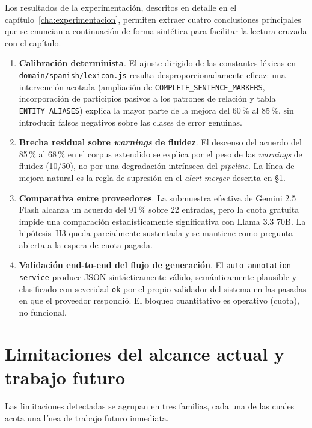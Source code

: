 Los resultados de la experimentación, descritos en detalle en el
capítulo~\ref{cha:experimentacion}, permiten extraer cuatro conclusiones
principales que se enuncian a continuación de forma sintética para facilitar la
lectura cruzada con el capítulo.

\begin{enumerate}
	\item \textbf{Calibración determinista}. El ajuste dirigido de las constantes léxicas
	      en \texttt{domain/spanish/lexicon.js} resulta desproporcionadamente eficaz: una
	      intervención acotada (ampliación de \texttt{COMPLETE\_SENTENCE\_MARKERS},
	      incorporación de participios pasivos a los patrones de relación y tabla
	      \texttt{ENTITY\_ALIASES}) explica la mayor parte de la mejora del 60\,\% al
	      85\,\%, sin introducir falsos negativos sobre las clases de error genuinas.
	\item \textbf{Brecha residual sobre \textit{warnings} de fluidez}. El descenso del
	      acuerdo del 85\,\% al 68\,\% en el corpus extendido se explica por el peso de
	      las \textit{warnings} de fluidez (10/50), no por una degradación intrínseca del
	      \textit{pipeline}. La línea de mejora natural es la regla de supresión en el
	      \textit{alert-merger} descrita en \S\ref{sec:limitaciones-trabajo-futuro}.
	\item \textbf{Comparativa entre proveedores}. La submuestra efectiva de Gemini 2.5
	      Flash alcanza un acuerdo del 91\,\% sobre 22 entradas, pero la cuota gratuita
	      impide una comparación estadísticamente significativa con Llama 3.3 70B. La
	      hipótesis~H3 queda parcialmente sustentada y se mantiene como pregunta abierta
	      a la espera de cuota pagada.
	\item \textbf{Validación end-to-end del flujo de generación}. El
	      \texttt{auto-annotation-service} produce JSON sintácticamente válido,
	      semánticamente plausible y clasificado con severidad \texttt{ok} por el propio
	      validador del sistema en las pasadas en que el proveedor respondió. El bloqueo
	      cuantitativo es operativo (cuota), no funcional.
\end{enumerate}

\section{Limitaciones del alcance actual y trabajo futuro}
\label{sec:limitaciones-trabajo-futuro}

Las limitaciones detectadas se agrupan en tres familias, cada una de las cuales
acota una línea de trabajo futuro inmediata.

